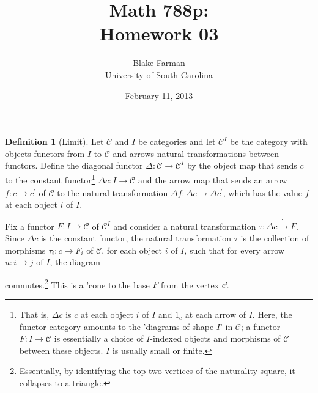 \documentclass[10pt]{amsart}
\author{Blake Farman\\University of South Carolina}
\title{Math 788p:\\Homework 03}
\date{February 11, 2013}
\begin{document}
\maketitle

\providecommand{\p}{\mathfrak{p}}
\providecommand{\m}{\mathfrak{m}}

\theoremstyle{plain}
\newtheorem{thm}{}
\newtheorem{lem}{Lemma}
\theoremstyle{definition}
\newtheorem{defn}{Definition}

\setcounter{thm}{2}

\begin{defn}[Limit]\label{def1}
  Let $\mathcal{C}$ and $I$ be categories and let $\mathcal{C}^{I}$ be the category with objects functors from $I$ to $\mathcal{C}$ and arrows natural transformations between functors.
  Define the diagonal functor $\Delta \colon \mathcal{C} \rightarrow \mathcal{C}^{I}$ by the object map that sends $c$ to the
  constant functor\footnote{That is, $\Delta c$ is $c$ at each object $i$ of $I$ and $1_c$ at each arrow of $I$.  
    Here, the functor category amounts to the 'diagrams of shape $I$' in $\mathcal{C}$; a functor $F \colon I \rightarrow \mathcal{C}$ is essentially a choice of $I$-indexed objects and morphisms of $\mathcal{C}$ between these objects.
    $I$ is usually small or finite.} 
  $\Delta c: I \rightarrow \mathcal{C}$ and the arrow map that sends an arrow $f: c \rightarrow c^\prime$ of $\mathcal{C}$ to the natural 
  transformation $\Delta f: \Delta c \dot{\rightarrow} \Delta c^\prime$, which has the value $f$ at each object $i$ of $I$.

  Fix a functor $F \colon I \rightarrow \mathcal{C}$ of $\mathcal{C}^{I}$ and consider a natural transformation $\tau \colon \Delta c \dot{\rightarrow} F$.
  Since $\Delta c$ is the constant functor, the natural transformation $\tau$ is the collection of morphisms $\tau_i \colon c \rightarrow F_i$ of $\mathcal{C}$, for each object $i$ of $I$, such that for every arrow $u \colon i \rightarrow j$ of $I$, the diagram 
  \begin{center}
  \end{center}
  commutes.\footnote{Essentially, by identifying the top two vertices of the naturality square, it collapses to a triangle.}
  This is a 'cone to the base $F$ from the vertex $c$'.
  

\end{defn}
\end{document}
